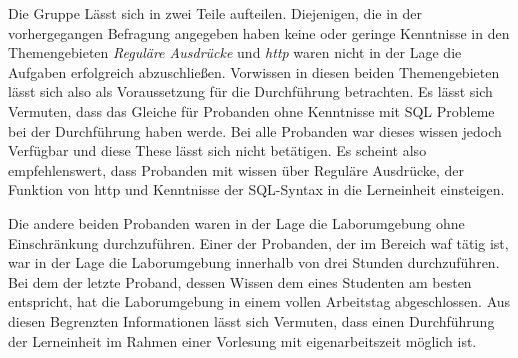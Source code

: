 Die Gruppe Lässt sich in zwei Teile aufteilen.
Diejenigen, die in der vorhergegangen Befragung angegeben haben keine oder geringe Kenntnisse in den Themengebieten \textit{Reguläre Ausdrücke} und \textit{\ac{http}} waren nicht in der Lage die Aufgaben erfolgreich abzuschließen.
Vorwissen in diesen beiden Themengebieten lässt sich also als Voraussetzung für die Durchführung betrachten.
Es lässt sich Vermuten, dass das Gleiche für Probanden ohne Kenntnisse mit SQL Probleme bei der Durchführung haben werde.
Bei alle Probanden war dieses wissen jedoch Verfügbar und diese These lässt sich nicht betätigen.
Es scheint also empfehlenswert, dass Probanden mit wissen über Reguläre Ausdrücke, der Funktion von \ac{http} und Kenntnisse der SQL-Syntax in die Lerneinheit einsteigen.

Die andere beiden Probanden waren in der Lage die Laborumgebung ohne Einschränkung durchzuführen.
Einer der Probanden, der im Bereich \ac{waf} tätig ist, war in der Lage die Laborumgebung innerhalb von drei Stunden durchzuführen.
Bei dem der letzte Proband, dessen Wissen dem eines Studenten am besten entspricht, hat die Laborumgebung in einem vollen Arbeitstag abgeschlossen.
Aus diesen Begrenzten Informationen lässt sich Vermuten, dass einen Durchführung der Lerneinheit im Rahmen einer Vorlesung mit eigenarbeitszeit möglich ist.

